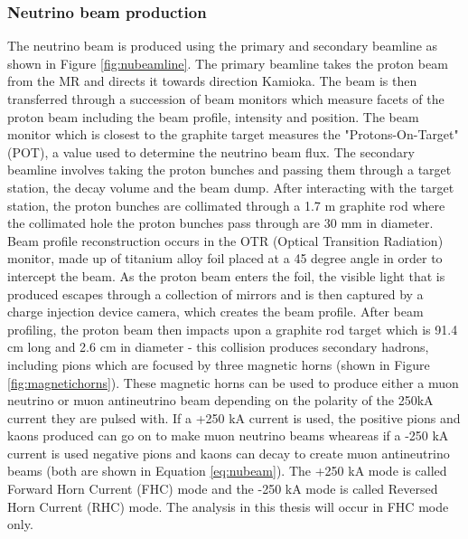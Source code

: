 \subsubsection{Neutrino beam production}

The neutrino beam is produced using the primary and secondary beamline as shown in Figure \ref{fig:nubeamline}. The primary beamline takes the proton beam from the MR and directs it towards direction Kamioka. The beam is then transferred through a succession of beam monitors which measure facets of the proton beam including the beam profile, intensity and position. The beam monitor which is closest to the graphite target measures the "Protons-On-Target" (POT), a value used to determine the neutrino beam flux. The secondary beamline involves taking the proton bunches and passing them through a target station, the decay volume and the beam dump. After interacting with the target station, the proton bunches are collimated through a 1.7 m graphite rod where the collimated hole the proton bunches pass through are 30 mm in diameter. Beam profile reconstruction occurs in the OTR (Optical Transition Radiation) monitor, made up of titanium alloy foil placed at a 45 degree angle in order to intercept the beam. As the proton beam enters the foil, the visible light that is produced escapes through a collection of mirrors and is then captured by a charge injection device camera, which creates the beam profile. 
\newline
After beam profiling, the proton beam then impacts upon a graphite rod target which is 91.4 cm long and 2.6 cm in diameter - this collision produces secondary hadrons, including pions which are focused by three magnetic horns (shown in Figure \ref{fig:magnetichorns}). These magnetic horns can be used to produce either a muon neutrino or muon antineutrino beam depending on the polarity of the 250kA current they are pulsed with. If a +250 kA current is used, the positive pions and kaons produced can go on to make muon neutrino beams wheareas if a -250 kA current is used negative pions and kaons can decay to create muon antineutrino beams (both are shown in Equation \ref{eq:nubeam}). The +250 kA mode is called Forward Horn Current (FHC) mode and the -250 kA mode is called Reversed Horn Current (RHC) mode. The analysis in this thesis will occur in FHC mode only. 

